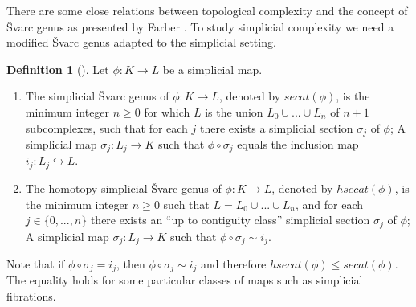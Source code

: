 \documentclass[preprint,11pt %
]{hjm1}
\newtheorem{theorem}{Theorem}[section]
\theoremstyle{definition}
\newtheorem{definition}[theorem]{Definition}
\begin{document}
There are some close relations between topological complexity and the concept of \v{S}varc genus as presented by Farber \cite{Far}. To study simplicial complexity we need a modified \v{S}varc genus 
adapted to the simplicial setting.

\begin{definition}[\cite{sim}]\label{genus}
Let $\phi : K \to L$ be a simplicial map. 
\begin{enumerate}
\item
The simplicial \v{S}varc genus of  $\phi : K \to L$, denoted by $secat(\phi)$, is the minimum integer $ n \geq 0$ for which $L$ is the union $L_0 \cup ...\cup L_n$ of $n + 1$ subcomplexes, such that for each $j$ there exists a simplicial section $\sigma _j$ of $\phi $; A simplicial map $\sigma _j : L_j \to K$ such that $\phi \circ \sigma _j$ equals the inclusion map $i_j : L_j \hookrightarrow L$. 

\item
The homotopy simplicial \v{S}varc genus of $\phi : K \to L$, denoted by $hsecat(\phi )$, is the minimum integer $ n \geq 0$ such that $L = L_0 \cup ...\cup L_n$, and for each $j \in \lbrace 0,...,n\rbrace $ there exists an “up to contiguity class” simplicial section $\sigma _j$ of $\phi $; A simplicial map $\sigma _j : L_j \to K$ such that $\phi \circ \sigma _j \sim i_j $. 
\end{enumerate}
\end{definition}


Note that if $\phi \circ \sigma _j = i_j $, then $\phi \circ \sigma _j \sim i_j $ and therefore
$hsecat(\phi)\leq secat (\phi )$. The equality holds for some particular classes of maps such as simplicial fibrations.
\end{document}
